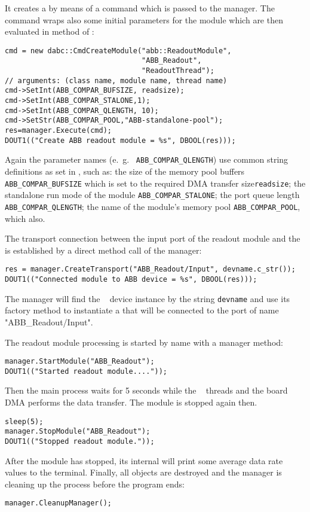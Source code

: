 \begin{compactenum}
\item It creates a  by means of a command
 which is passed to the manager. The 
command wraps also some initial
parameters for the module which are then evaluated in 
method  of :

\begin{verbatim}
cmd = new dabc::CmdCreateModule("abb::ReadoutModule",
                                "ABB_Readout", 
                                "ReadoutThread");
// arguments: (class name, module name, thread name)
cmd->SetInt(ABB_COMPAR_BUFSIZE, readsize);
cmd->SetInt(ABB_COMPAR_STALONE,1);
cmd->SetInt(ABB_COMPAR_QLENGTH, 10);
cmd->SetStr(ABB_COMPAR_POOL,"ABB-standalone-pool");
res=manager.Execute(cmd);
DOUT1(("Create ABB readout module = %s", DBOOL(res)));
\end{verbatim}

Again the parameter names (e.~g.~ {\tt ABB\_COMPAR\_QLENGTH}) use
common string definitions as set in , 
such as: 
the size of the memory pool buffers {\tt ABB\_COMPAR\_BUFSIZE} which is
set to the required DMA transfer size{\tt readsize};
the standalone run mode of the module {\tt ABB\_COMPAR\_STALONE};
the port queue length {\tt ABB\_COMPAR\_QLENGTH}; the name of
the module's memory pool {\tt ABB\_COMPAR\_POOL}, which also. 

\item The transport connection between the input port of the readout module and
the  is established by a direct method call of the manager:
\begin{verbatim}
res = manager.CreateTransport("ABB_Readout/Input", devname.c_str());
DOUT1(("Connected module to ABB device = %s", DBOOL(res)));
\end{verbatim}  
The manager will find the \ABB~ device instance by the string {\tt devname}
and use its factory method  to instantiate a
 that will be connected to the port of name
"ABB\_Readout/Input".

\item The readout module processing 
is started by name with a manager method:
\begin{verbatim}
manager.StartModule("ABB_Readout");
DOUT1(("Started readout module...."));
\end{verbatim}
Then the main process waits for 5 seconds while the \dabc~ threads
and the board DMA performs the data transfer. The module is stopped
again then.
\begin{verbatim}      
sleep(5);
manager.StopModule("ABB_Readout");
DOUT1(("Stopped readout module."));
\end{verbatim}
After the module has stopped, its internal 
will print some average data rate values to the terminal.
Finally, all objects are destroyed and the manager is
cleaning up the process before the program ends:
\begin{verbatim} 
manager.CleanupManager();
\end{verbatim}
   
\end{compactenum} 

